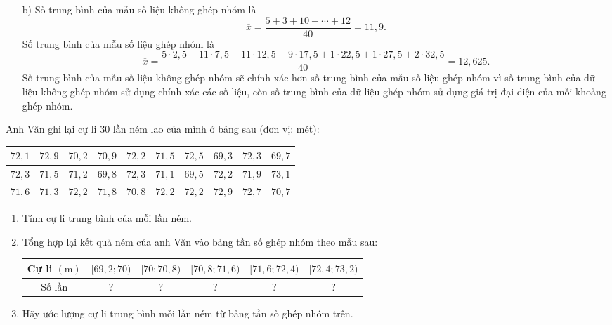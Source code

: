 \begin{bt}
{\begin{enumerate}
\begin{center}
\begin{tabular}{|c|c|c|c|c|c|c|c|}
					\hline
				\end{tabular}
			\end{center}
			\item [b)] Số trung bình của mẫu số liệu không ghép nhóm là
			$$\overline{x}=\dfrac{5+3+10+\cdots +12}{40}=11{,}9.$$
			Số trung bình của mẫu số liệu ghép nhóm là
			$$\overline{x}=\dfrac{5\cdot 2{,}5+11\cdot 7{,}5+11\cdot 12{,}5+9\cdot 17{,}5+1\cdot 22{,}5+1\cdot 27{,}5+2\cdot 32{,}5}{40}=12{,}625.$$
			Số trung bình của mẫu số liệu không ghép nhóm sẽ chính xác hơn số trung bình của mẫu số liệu ghép nhóm vì số trung bình của dữ liệu không ghép nhóm sử dụng chính xác các số liệu, còn số trung bình của dữ liệu ghép nhóm sử dụng giá trị đại diện của mỗi khoảng ghép nhóm.
		\end{enumerate}
	}
\end{bt}
\begin{bt}%
	Anh Văn ghi lại cự li 30 lần ném lao của mình ở bảng sau (đơn vị: mét):
	\begin{center}
		\begin{tabular}{|c|c|c|c|c|c|c|c|c|c|}
			\hline $72{,}1$ & $72{,}9$ & $70{,}2$ & $70{,}9$ & $72{,}2$ & $71{,}5$ & $72{,}5$ & $69{,}3$ & $72{,}3$ & $69{,}7$ \\
			\hline $72{,}3$ & $71{,}5$ & $71{,}2$ & $69{,}8$ & $72{,}3$ & $71{,}1$ & $69{,}5$ & $72{,}2$ & $71{,}9$ & $73{,}1$ \\
			\hline $71{,}6$ & $71{,}3$ & $72{,}2$ & $71{,}8$ & $70{,}8$ & $72{,}2$ & $72{,}2$ & $72{,}9$ & $72{,}7$ & $70{,}7$ \\
			\hline
		\end{tabular}
	\end{center}
	\begin{enumerate}
		\item Tính cự li trung bình của mỗi lần ném.
		\item Tổng hợp lại kết quả ném của anh Văn vào bảng tần số ghép nhóm theo mẫu sau:
		\begin{center}
			\begin{tabular}{|c|c|c|c|c|c|}
				\hline Cự li $(\mathrm{m})$ &{$[69{,}2; 70)$} &{$[70; 70{,}8)$} &{$[70{,}8; 71{,}6)$} &{$[71{,}6; 72{,}4)$} &{$[72{,}4; 73{,}2)$} \\
				\hline Số lần & $?$ & $?$ & $?$ & $?$ & $?$ \\
				\hline
			\end{tabular}
		\end{center}
		\item Hãy ước lượng cự li trung bình mỗi lần ném từ bảng tần số ghép nhóm trên.

\end{enumerate}
\end{bt}
